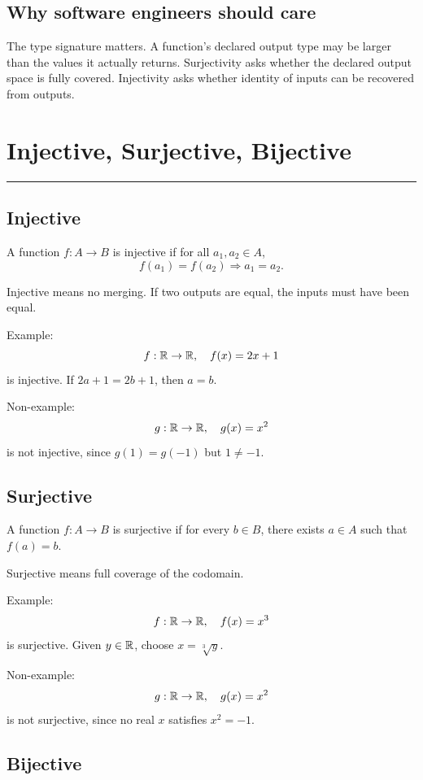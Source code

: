 \documentclass[12pt]{article}
\newcommand{\chapterline}{\vspace{0.4em}\hrule\vspace{0.8em}}
\begin{document}
\subsection{Why software engineers should care}

The type signature matters. A function's declared output type may be larger than the values it actually returns. Surjectivity asks whether the declared output space is fully covered. Injectivity asks whether identity of inputs can be recovered from outputs.

\newpage
\section{Injective, Surjective, Bijective}
\chapterline

\subsection{Injective}

\begin{definition}
A function $f:A\to B$ is injective if for all $a_1,a_2\in A$,
\[
f(a_1)=f(a_2)\Rightarrow a_1=a_2.
\]
\end{definition}

Injective means no merging. If two outputs are equal, the inputs must have been equal.

Example:
\[
f:\mathbb{R}\to\mathbb{R},\quad f(x)=2x+1
\]
is injective. If $2a+1=2b+1$, then $a=b$.

Non-example:
\[
g:\mathbb{R}\to\mathbb{R},\quad g(x)=x^2
\]
is not injective, since $g(1)=g(-1)$ but $1\neq-1$.

\subsection{Surjective}

\begin{definition}
A function $f:A\to B$ is surjective if for every $b\in B$, there exists $a\in A$ such that $f(a)=b$.
\end{definition}

Surjective means full coverage of the codomain.

Example:
\[
f:\mathbb{R}\to\mathbb{R},\quad f(x)=x^3
\]
is surjective. Given $y\in\mathbb{R}$, choose $x=\sqrt[3]{y}$.

Non-example:
\[
g:\mathbb{R}\to\mathbb{R},\quad g(x)=x^2
\]
is not surjective, since no real $x$ satisfies $x^2=-1$.

\subsection{Bijective}
\end{document}
